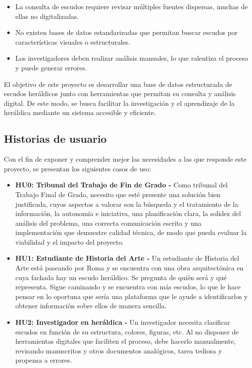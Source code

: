 \begin{itemize}
    \item La consulta de escudos requiere revisar múltiples fuentes dispersas, 
    muchas de ellas no digitalizadas.
    \item No existen bases de datos estandarizadas que permitan buscar escudos por
    características visuales o estructurales.
    \item Los investigadores deben realizar análisis manuales, lo que ralentiza el
    proceso y puede generar errores.
\end{itemize}

El objetivo de este proyecto es desarrollar una base de datos estructurada de escudos
heráldicos junto con herramientas que permitan su consulta y análisis digital. De este
modo, se busca facilitar la investigación y el aprendizaje de la heráldica mediante un
sistema accesible y eficiente.

\subsection{Historias de usuario}
Con el fin de exponer y comprender mejor las necesidades a las que responde este
proyecto, se presentan los siguientes casos de uso:

\begin{itemize}
    \item \textbf{HU0: Tribunal del Trabajo de Fin de Grado - } Como tribunal del Trabajo
    Final de Grado, necesito que esté presente una solución bien justificada, cuyos
    aspectos a valorar son la búsqueda y el tratamiento de la información, la autonomía
    e iniciativa, una planificación clara, la solidez del análisis del problema, una 
    correcta comunicación escrita y una implementación que demuestre calidad técnica,
    de modo que pueda evaluar la viabilidad y el impacto del proyecto.
    \item \textbf{HU1: Estudiante de Historia del Arte - } Un estudiante de Historia del 
    Arte está paseando por Roma y se encuentra con una obra arquitectónica en cuya fachada
    hay un escudo heráldico. Se pregunta de quién será y qué representa. Sigue caminando 
    y se encuentra con más escudos, lo que le hace pensar en lo oportuna que sería una 
    plataforma que le ayude a identificarlos y obtener información sobre ellos de manera 
    sencilla.
    \item \textbf{HU2: Investigador en heráldica - } Un investigador necesita clasificar
    escudos en función de su estructura, colores, figuras, etc. Al no disponer de 
    herramientas digitales que faciliten el proceso, debe hacerlo manualmente, revisando
    manuscritos y otros documentos analógicos, tarea tediosa y propensa a errores.

\end{itemize}


